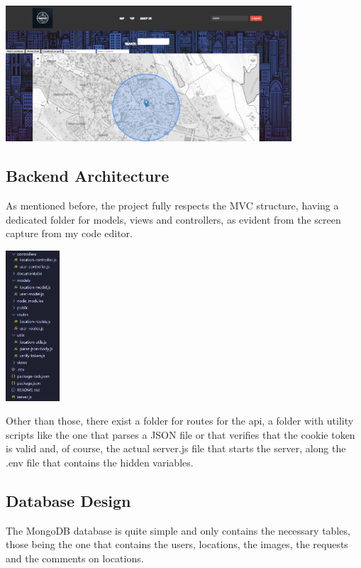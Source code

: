 \documentclass[12pt,a4paper]{report}
\begin{document}
\begin{center}
\includegraphics[width=0.8\textwidth]{images/ui.png}
\end{center}


\subsection{Backend Architecture}

As mentioned before, the project fully respects the MVC structure, having a dedicated folder for models, views and controllers, as evident from the screen capture from my code editor.

\includegraphics[width=0.15\textwidth]{images/back.png}

Other than those, there exist a folder for routes for the api, a folder with utility scripts like the one that parses a JSON file or that verifies that the cookie token is valid and, of course, the actual server.js file that starts the server, along the .env file that contains the hidden variables. 

\subsection{Database Design}

The MongoDB database is quite simple and only contains the necessary tables, those being the one that contains the users, locations, the images, the requests and the comments on locations.
\end{document}
